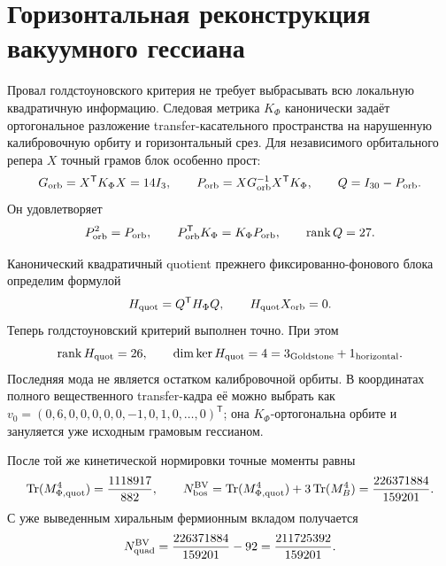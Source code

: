 \chapter{Горизонтальная реконструкция вакуумного гессиана}
\label{ch:v8-gauge-invariant-vacuum-hessian-reconstruction-gate}

Провал голдстоуновского критерия не требует выбрасывать всю локальную
квадратичную информацию. Следовая метрика $K_{\Phi}$ канонически задаёт
ортогональное разложение transfer-касательного пространства на нарушенную
калибровочную орбиту и горизонтальный срез. Для независимого орбитального
репера $X$ точный грамов блок особенно прост:
\begin{equation}
 G_{\rm orb}=X^{\mathsf T}K_{\Phi}X=14I_3,
 \qquad
 P_{\rm orb}=XG_{\rm orb}^{-1}X^{\mathsf T}K_{\Phi},
 \qquad Q=I_{30}-P_{\rm orb}.
 \label{eq:v8-horizontal-orbit-projector}
\end{equation}
Он удовлетворяет
\begin{equation}
 P_{\rm orb}^2=P_{\rm orb},\qquad
 P_{\rm orb}^{\mathsf T}K_{\Phi}=K_{\Phi}P_{\rm orb},\qquad
 \operatorname{rank} Q=27.
 \label{eq:v8-horizontal-projector-properties}
\end{equation}

Канонический квадратичный quotient прежнего фиксированно-фонового блока
определим формулой
\begin{equation}
 H_{\rm quot}=Q^{\mathsf T}H_{\Phi}Q,
 \qquad H_{\rm quot}X_{\rm orb}=0.
 \label{eq:v8-horizontal-quotient-hessian}
\end{equation}
Теперь голдстоуновский критерий выполнен точно. При этом
\begin{equation}
 \operatorname{rank} H_{\rm quot}=26,\qquad
 \dim\ker H_{\rm quot}=4=3_{\rm Goldstone}+1_{\rm horizontal}.
 \label{eq:v8-horizontal-kernel-decomposition}
\end{equation}
Последняя мода не является остатком калибровочной орбиты. В координатах
полного вещественного transfer-кадра её можно выбрать как
$v_0=(0,6,0,0,0,0,0,-1,0,1,0,\ldots,0)^{\mathsf T}$; она
$K_{\Phi}$-ортогональна орбите и зануляется уже исходным грамовым
гессианом.

После той же кинетической нормировки точные моменты равны
\begin{equation}
 \operatorname{Tr}(M_{\Phi,{\rm quot}}^4)=\frac{1118917}{882},
 \qquad
 N_{\rm bos}^{\rm BV}
 =\operatorname{Tr}(M_{\Phi,{\rm quot}}^4)+3\operatorname{Tr}(M_B^4)
 =\frac{226371884}{159201}.
 \label{eq:v8-horizontal-bv-bosonic-ledger}
\end{equation}
С уже выведенным хиральным фермионным вкладом получается
\begin{equation}
 N_{\rm quad}^{\rm BV}
 =\frac{226371884}{159201}-92
 =\frac{211725392}{159201}.
 \label{eq:v8-horizontal-full-quadratic-numerator}
\end{equation}

